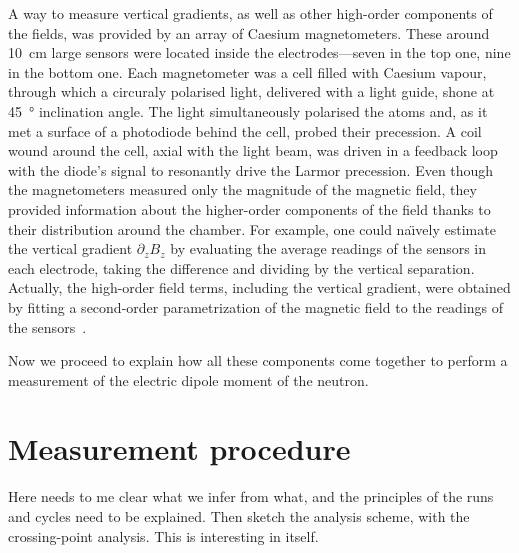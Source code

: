 A way to measure vertical gradients, as well as other high-order components of the fields, was provided by an array of Caesium magnetometers. These around \SI{10}{\centi\meter} large sensors were located inside the electrodes---seven in the top one, nine in the bottom one. Each magnetometer was a cell filled with Caesium vapour, through which a circuraly polarised light, delivered with a light guide, shone at \SI{45}{\degree} inclination angle. The light simultaneously polarised the atoms and, as it met a surface of a photodiode behind the cell, probed their precession. A coil wound around the cell, axial with the light beam, was driven in a feedback loop with the diode's signal to resonantly drive the Larmor precession. Even though the magnetometers measured only the magnitude of the magnetic field, they provided information about the higher-order components of the field thanks to their distribution around the chamber. For example, one could na\"\i vely estimate the vertical gradient $\partial_z B_z$ by evaluating the average readings of the sensors in each electrode, taking the difference and dividing by the vertical separation. Actually, the high-order field terms, including the vertical gradient, were obtained by fitting a second-order parametrization of the magnetic field to the readings of the sensors~\cite{WurstenThesis}.

Now we proceed to explain how all these components come together to perform a measurement of the electric dipole moment of the neutron.



\section{Measurement procedure}
Here needs to me clear what we infer from what, and the principles of the runs and cycles need to be explained. Then sketch the analysis scheme, with the crossing-point analysis. This is interesting in itself.

